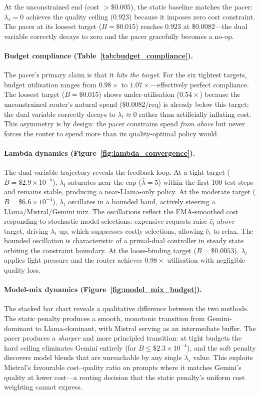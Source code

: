 At the unconstrained end (cost $> \$0.005$), the static baseline
matches the pacer:
$\lambda_s{=}0$ achieves the quality ceiling ($0.923$) because it
imposes zero cost constraint.
The pacer at its loosest target ($B{=}\$0.015$) reaches $0.923$
at \$0.0082---the dual variable correctly decays to zero and the
pacer gracefully becomes a no-op.

\paragraph{Budget compliance (Table~\ref{tab:budget_compliance}).}
The pacer's primary claim is that it \emph{hits the target}.
For the six tightest targets, budget utilisation ranges from
$0.98\times$ to $1.07\times$---effectively perfect compliance.
The loosest target ($B{=}\$0.015$) shows
under-utilisation ($0.54\times$) because the
unconstrained router's natural spend (\$0.0082/req) is already below
this target; the dual variable correctly decays to
$\lambda_t \approx 0$ rather than artificially inflating cost.
This asymmetry is by design: the pacer constrains spend
\emph{from above} but never forces the router to spend more than its
quality-optimal policy would.

\paragraph{Lambda dynamics (Figure~\ref{fig:lambda_convergence}).}
The dual-variable trajectory reveals the feedback loop.
At a tight target ($B{=}\$2.9{\times}10^{-5}$), $\lambda_t$
saturates near the cap ($\bar\lambda{=}5$) within the first 100
test steps and remains stable, producing a near-Llama-only policy.
At the moderate target ($B{=}\$6.6{\times}10^{-4}$), $\lambda_t$
oscillates in a bounded band, actively steering a
Llama/Mistral/Gemini mix.  The oscillations reflect the
EMA-smoothed cost responding to stochastic model selections:
expensive requests raise $\bar{c}_t$ above target, driving
$\lambda_t$ up, which suppresses costly selections, allowing
$\bar{c}_t$ to relax.  The bounded oscillation is characteristic
of a primal-dual controller in steady state orbiting the constraint
boundary.
At the loose-binding target ($B{=}\$0.0053$), $\lambda_t$
applies light pressure and the router achieves
$0.98\times$ utilisation with negligible quality loss.

\paragraph{Model-mix dynamics (Figure~\ref{fig:model_mix_budget}).}
The stacked bar chart reveals a qualitative difference between the
two methods.
The static penalty produces a smooth, monotonic transition from
Gemini-dominant to Llama-dominant, with Mistral serving as an
intermediate buffer.
The pacer produces a \emph{sharper} and more principled transition:
at tight budgets the hard ceiling eliminates Gemini entirely
(for $B \leq \$2.3{\times}10^{-4}$), and the soft penalty discovers
model blends that are unreachable by any single $\lambda_s$ value.
This exploits Mistral's favourable cost--quality ratio on prompts
where it matches Gemini's quality at lower cost---a
routing decision that the static penalty's uniform cost weighting
cannot express.

